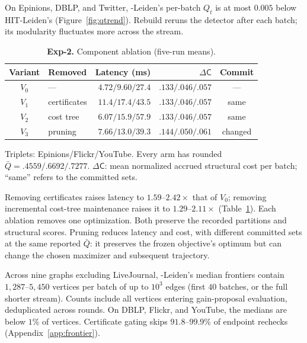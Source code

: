  On Epinions, DBLP, and Twitter,
\DyLo{}-Leiden's per-batch $Q_t$ is at most $0.005$ below HIT-Leiden's
(Figure~\ref{fig:qtrend}). Rebuild reruns the detector after each batch;
its modularity fluctuates more across the stream.

\begin{table}[tb]
\centering
\caption{\textbf{Exp-2.} Component ablation (five-run means).}
\label{tab:ablation}
\begin{scriptsize}
\setlength{\tabcolsep}{0.25em}
\begin{tabular*}{\linewidth}{@{\extracolsep{\fill}}clrrc@{}}
\toprule
Variant & Removed & Latency (ms) & $\Delta\mathsf C$ & Commit \\
\midrule
$V_0$ & ---          & $4.72/9.60/27.4$ & $.133/.046/.057$ & --- \\
\midrule
$V_1$ & certificates & $11.4/17.4/43.5$ & $.133/.046/.057$ & same \\
$V_2$ & cost tree    & $6.07/15.9/57.9$ & $.133/.046/.057$ & same \\
$V_3$ & pruning      & $7.66/13.0/39.3$ & $.144/.050/.061$ & changed \\
\bottomrule
\end{tabular*}
\par\smallskip\raggedright
Triplets: Epinions/Flickr/YouTube. Every arm has rounded
$\bar Q=.4559/.6692/.7277$. $\Delta\mathsf C$: mean normalized accrued
structural cost per batch; ``same'' refers to the committed sets.
\end{scriptsize}
\end{table}

Removing certificates raises latency to $1.59$--$2.42\times$ that of $V_0$;
removing incremental cost-tree maintenance raises it to $1.29$--$2.11\times$
(Table~\ref{tab:ablation}). Each ablation removes one optimization. Both
preserve the recorded partitions and structural scores. Pruning reduces
latency and cost, with different committed sets at the same reported
$\bar Q$: it preserves the frozen objective's optimum but can change the
chosen maximizer and subsequent trajectory.

 Across nine graphs excluding
LiveJournal, \DyLo{}-Leiden's median frontiers contain $1{,}287$--$5{,}450$ vertices per batch
of up to $10^3$ edges (first $40$ batches, or the full shorter stream).
Counts include all vertices entering gain-proposal evaluation, deduplicated
across rounds. On DBLP, Flickr, and YouTube, the medians are below $1\%$ of
vertices. Certificate gating skips $91.8$--$99.9\%$ of endpoint rechecks
(Appendix~\ref{app:frontier}).

